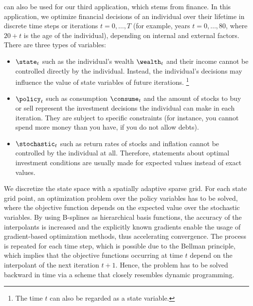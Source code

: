 
\label{chap:80finance}

can also be used for our third application,
which stems from finance.
In this application, we optimize financial decisions of an individual
over their lifetime in discrete time steps or iterations $t = 0, \dotsc, T$
(for example, years $t = 0, \dotsc, 80$, where $20+t$ is the age
of the individual), depending on internal and external factors.
There are three types of variables:

\begin{itemize}
  \item
   $\state_t$
  such as the individual's wealth $\wealth_t$ and their income
  cannot be controlled directly by the individual.
  Instead, the individual's decisions may influence the value of
  state variables of future iterations.%
  \footnote{%
    The time $t$ can also be regarded as a state variable.%
  }
  
  \item
   $\policy_t$
  such as consumption $\consume_t$ and the amount of stocks to buy or sell
  represent the investment decisions the individual can make in
  each iteration.
  They are subject to specific constraints
  (for instance, you cannot spend more money than you have,
  if you do not allow debts).
  
  \item
   $\stochastic_t$
  such as return rates of stocks and inflation
  cannot be controlled by the individual at all.
  Therefore, statements about optimal investment conditions
  are usually made for expected values instead of exact values.
\end{itemize}

\noindent
We discretize the state space with a spatially adaptive sparse grid.
For each state grid point, an optimization problem over the policy
variables has to be solved, where the objective function depends
on the expected value over the stochastic variables.
By using B-splines as hierarchical basis functions,
the accuracy of the interpolants is increased and
the explicitly known gradients enable the usage of
gradient-based optimization methods, thus accelerating convergence.
The process is repeated for each time step,
which is possible due to the Bellman principle,
which implies that the objective functions
occurring at time $t$ depend on the interpolant of the next iteration $t+1$.
Hence, the problem has to be solved backward in time
via a scheme that closely resembles dynamic programming.

